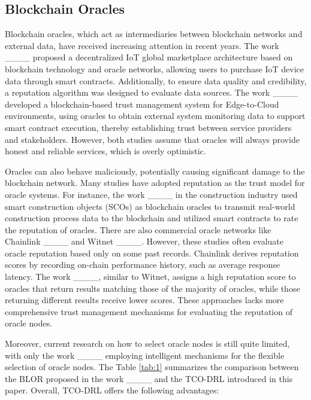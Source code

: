 \subsection{Blockchain Oracles}
Blockchain oracles, which act as intermediaries between blockchain networks and external data, have received increasing attention in recent years. The work ____ proposed a decentralized IoT global marketplace architecture based on blockchain technology and oracle networks, allowing users to purchase IoT device data through smart contracts. Additionally, to ensure data quality and credibility, a reputation algorithm was designed to evaluate data sources. The work ____ developed a blockchain-based trust management system for Edge-to-Cloud environments, using oracles to obtain external system monitoring data to support smart contract execution, thereby establishing trust between service providers and stakeholders. However, both studies assume that oracles will always provide honest and reliable services, which is overly optimistic.

Oracles can also behave maliciously, potentially causing significant damage to the blockchain network. Many studies have adopted reputation as the trust model for oracle systems. For instance, the work ____ in the construction industry used smart construction objects (SCOs) as blockchain oracles to transmit real-world construction process data to the blockchain and utilized smart contracts to rate the reputation of oracles. There are also commercial oracle networks like Chainlink ____ and Witnet ____. However, these studies often evaluate oracle reputation based only on some past records. Chainlink derives reputation scores by recording on-chain performance history, such as average response latency. The work ____, similar to Witnet, assigns a high reputation score to oracles that return results matching those of the majority of oracles, while those returning different results receive lower scores. These approaches lacks more comprehensive trust management mechanisms for evaluating the reputation of oracle nodes.

Moreover, current research on how to select oracle nodes is still quite limited, with only the work ____ employing intelligent mechanisms for the flexible selection of oracle nodes. The Table \ref{tab:1} summarizes the comparison between the BLOR proposed in the work ____ and the TCO-DRL introduced in this paper. Overall, TCO-DRL offers the following advantages:

